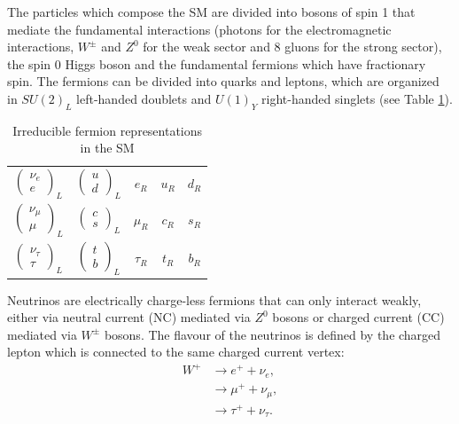 The particles which compose the SM are divided into bosons of spin 1 that mediate the fundamental interactions (photons for the electromagnetic interactions, $W^{\pm}$ and $Z^0$
for the weak sector and 8 gluons for the strong sector), the spin 0 Higgs boson and the fundamental fermions which have fractionary spin.  The fermions can be divided into quarks and leptons, which are organized in $SU(2)_L$ left-handed doublets and $U(1)_Y$ right-handed singlets (see Table \ref{tab:SM}).

\begin{table}
    \centering
    \begin{tabular}{cc|ccc}
    \hline \hline
         $\begin{pmatrix}\nu_e\\e\end{pmatrix}_L$& $\begin{pmatrix}u\\d\end{pmatrix}_L$ & $e_R$ & $u_R$ & $d_R$\\
         $\begin{pmatrix}\nu_\mu\\\mu\end{pmatrix}_L$& $\begin{pmatrix}c\\s\end{pmatrix}_L$ & $\mu_R$ & $c_R$ & $s_R$\\
         $\begin{pmatrix}\nu_\tau\\\tau\end{pmatrix}_L$& $\begin{pmatrix}t\\b\end{pmatrix}_L$ & $\tau_R$ & $t_R$ & $b_R$\\
    \hline \hline
    \end{tabular}
    \caption{Irreducible fermion representations in the SM}
    \label{tab:SM}
\end{table}


Neutrinos are electrically charge-less fermions that can only interact weakly, either via neutral current (NC) mediated via $Z^0$ bosons or charged current (CC) mediated via $W^\pm$ bosons. The flavour of the neutrinos is defined by the charged lepton which is connected to the same charged current vertex:
\begin{equation}
\label{eq:weakeigenstates}
\begin{aligned}
    W^+ &\rightarrow e^+ + \nu_e ,\\
    &\rightarrow \mu^+ + \nu_\mu ,\\
    &\rightarrow \tau^+ + \nu_\tau .\\
\end{aligned}
\end{equation}

